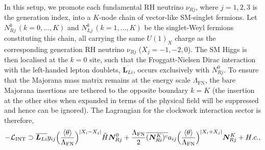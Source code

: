 \documentclass[11pt,letterpaper]{article}
\begin{document}
In this setup, we promote each fundamental RH neutrino $\nu_{Rj}$, where $j=1,2,3$ is the generation index, into a $K$-node chain of vector-like SM-singlet fermions. Let
$N_{Rj}^k \, (k=0,\dots,K)$ and $N_{Lj}^k \, (k=1,\dots,K)$ be the
singlet-Weyl fermions constituting this chain, all carrying the same $U(1)_X$ charge as the corresponding generation RH neutrino $\nu_{Rj}$ ($X_j = -1,-2,0$). The SM Higgs is then localised
at the $k=0$ site, such that the Froggatt-Nielsen Dirac interaction with the
left-handed lepton doublets, $\overline{\bm{L}_{L i}}$, occurs exclusively
with $N_{R j}^0$. To ensure that the Majorana mass matrix remains at the energy scale $\Lambda_{\text{FN}}$, the bare Majorana insertions are tethered to the opposite boundary $k=K$ (the insertion at the other sites when expanded in terms of the physical field will be suppressed and hence can be ignored). The Lagrangian for the clockwork interaction sector is therefore,
\begin{equation} \label{eqn:CWInt}
    \small
    -\mathcal{L}_{\text{INT}}  \supset  \overline{\bm{L}_{L i}} y_{ ij} \Big( \frac{\langle\theta\rangle}{\Lambda_{\text{FN}}}\Big)^{|X_i - X_j|} \tilde{H} \bm{N}^0_{R j}  +  \frac{\Lambda_{\text{FN}}}{2}  \overline{(\bm{N}_{Ri}^K)^c} a_{ij}  \Big( \frac{\langle\theta\rangle}{\Lambda_{\text{FN}}}\Big)^{|X_i + X_j|} \bm{N}_{Rj}^K + H.c.,
\end{equation}
\end{document}
